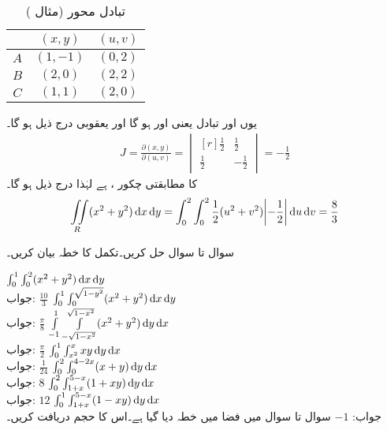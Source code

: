 %
\begin{table}
\caption{تبادل محور (مثال )}
\label{جدول_مثال_خطی_تکمل_دوہرا_ب}
\centering
\begin{tabular}{c c c}
& $(x,y)$& $(u,v)$\\
\hline
$A$&$(1,-1)$&$(0,2)$\\
$B$&$(2,0)$&$(2,2)$\\
$C$&$(1,1)$&$(2,0)$
\end{tabular}
\end{table}

یوں   اور  تبادل یعنی   اور   ہو گا اور یعقوبی درج ذیل ہو گا۔
\begin{align*}
J=\frac{\partial (x,y)}{\partial (u,v)}=
\begin{vmatrix*}[r]
\frac{1}{2}&\frac{1}{2}\\[0.5em]
\frac{1}{2}&-\frac{1}{2}
\end{vmatrix*}=-\frac{1}{2}
\end{align*}
 کا مطابقتی چکور ،  ہے لہٰذا درج ذیل ہو گا۔
\begin{align*}
\iint\limits_R (x^2+y^2)\dif x\dif y=\int_0^2\int_0^2 \frac{1}{2}(u^2+v^2)\abs{-\frac{1}{2}}\dif u\dif v=\frac{8}{3}
\end{align*}

سوال  تا سوال  حل کریں۔تکمل کا خطہ بیان کریں۔

\quad
$\int_0^1\int_0^2 (x^2+y^2)\dif x\dif y$\\
جواب:\quad
$\tfrac{10}{3}$
\quad
$\int_0^1\int_0^{\sqrt{1-y^2}} (x^2+y^2)\dif x\dif y$\\
جواب:\quad
$\tfrac{\pi}{8}$
\quad
$\int\limits_{-1}^1\int\limits_{-\sqrt{1-x^2}}^{\sqrt{1-x^2}} (x^2+y^2)\dif y\dif x$\\
جواب:\quad
$\tfrac{\pi}{2}$
\quad
$\int_{0}^1\int_{x^2}^{x} xy\dif y\dif x$\\
جواب:\quad
$\tfrac{1}{24}$
\quad
$\int_{0}^2\int_{0}^{4-2x} (x+y)\dif y\dif x$\\
جواب:\quad
$8$
\quad
$\int_{0}^2\int_{1+x}^{5-x} (1+xy)\dif y\dif x$\\
جواب:\quad
$12$
\quad
$\int_{0}^1\int_{1+x}^{5-x} (1-xy)\dif y\dif x$\\
جواب:\quad
$-1$
سوال  تا سوال  میں فضا میں خطہ دیا گیا ہے۔اس کا حجم دریافت کریں۔

